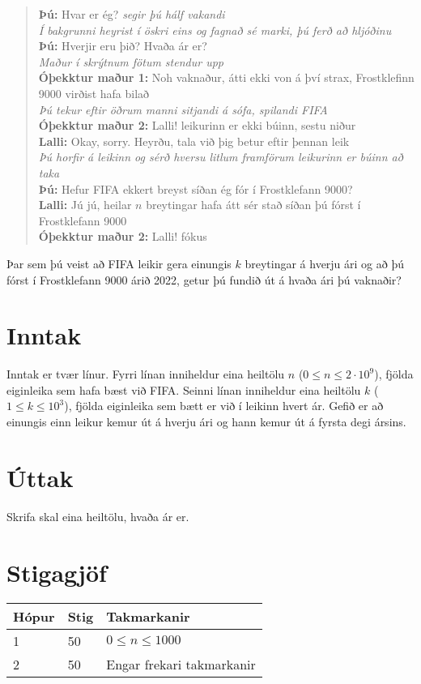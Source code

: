 
\begin{quote}
	\textbf{Þú:} Hvar er ég? \textit{segir þú hálf vakandi} \\
	\textit{Í bakgrunni heyrist í öskri eins og fagnað sé marki, þú ferð að hljóðinu} \\
	\textbf{Þú:} Hverjir eru þið? Hvaða ár er? \\
	\textit{Maður í skrýtnum fötum stendur upp} \\
	\textbf{Óþekktur maður 1:} Noh vaknaður, átti ekki von á því strax, Frostklefinn 9000 virðist hafa bilað \\
	\textit{Þú tekur eftir öðrum manni sitjandi á sófa, spilandi FIFA} \\
	\textbf{Óþekktur maður 2:} Lalli! leikurinn er ekki búinn, sestu niður \\
	\textbf{Lalli:} Okay, sorry. Heyrðu, tala við þig betur eftir þennan leik \\
	\textit{Þú horfir á leikinn og sérð hversu litlum framförum leikurinn er búinn að taka} \\
	\textbf{Þú:} Hefur FIFA ekkert breyst síðan ég fór í Frostklefann 9000? \\
	\textbf{Lalli:} Jú jú, heilar $n$ breytingar hafa átt sér stað síðan þú fórst í Frostklefann 9000 \\
	\textbf{Óþekktur maður 2:} Lalli! fókus
\end{quote}
Þar sem þú veist að FIFA leikir gera einungis $k$ breytingar á hverju ári og að þú fórst í Frostklefann 9000 árið 2022,
getur þú fundið út á hvaða ári þú vaknaðir?

\section*{Inntak}
Inntak er tvær línur.
Fyrri línan inniheldur eina heiltölu $n$ ($0 \le n \le 2 \cdot 10^9$), fjölda eiginleika sem hafa bæst við FIFA.
Seinni línan inniheldur eina heiltölu $k$ ($1 \le k \le 10^3$), fjölda eiginleika sem bætt er við í leikinn hvert ár.
Gefið er að einungis einn leikur kemur út á hverju ári og hann kemur út á fyrsta degi ársins.

\section*{Úttak}
Skrifa skal eina heiltölu, hvaða ár er. 

\section*{Stigagjöf}
\begin{tabular}{|l|l|l|}
\hline
Hópur & Stig & Takmarkanir \\ \hline
1     & 50   & $0 \leq n \leq 1000$ \\ \hline
2     & 50   & Engar frekari takmarkanir \\ \hline
\end{tabular}

